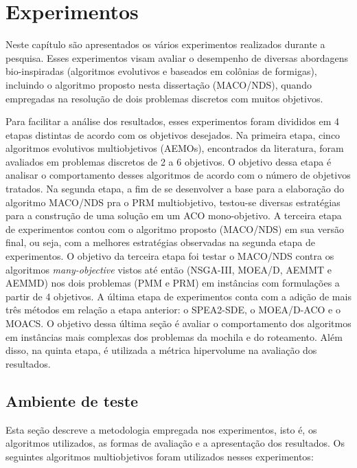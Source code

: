 \chapter[Experimentos]{Experimentos}
\label{chapter_experimentos}

Neste capítulo são apresentados os vários experimentos realizados durante a pesquisa. Esses experimentos visam avaliar o desempenho de diversas abordagens bio-inspiradas (algoritmos evolutivos e baseados em colônias de formigas), incluindo o algoritmo proposto nesta dissertação (MACO/NDS), quando empregadas na resolução de dois problemas discretos com muitos objetivos. 

Para facilitar a análise dos resultados, esses experimentos foram divididos em 4 etapas distintas de acordo com os objetivos desejados. Na primeira etapa, cinco algoritmos evolutivos multiobjetivos (AEMOs), encontrados da literatura, foram avaliados em problemas discretos de 2 a 6 objetivos. O objetivo dessa etapa é analisar o comportamento desses algoritmos de acordo com o número de objetivos tratados. Na segunda etapa, a fim de se desenvolver a base para a elaboração do algoritmo MACO/NDS pra o PRM multiobjetivo, testou-se diversas estratégias para a construção de uma solução em um ACO mono-objetivo. A terceira etapa de experimentos contou com o algoritmo proposto (MACO/NDS) em sua versão final, ou seja, com a melhores estratégias observadas na segunda etapa de experimentos. O objetivo da terceira etapa foi testar o MACO/NDS contra os algoritmos \textit{many-objective} vistos até então (NSGA-III, MOEA/D, AEMMT e AEMMD) nos dois problemas (PMM e PRM) em instâncias com formulações a partir de 4 objetivos. A última etapa de experimentos conta com a adição de mais três métodos em relação a etapa anterior: o SPEA2-SDE, o MOEA/D-ACO e o MOACS. O objetivo dessa última seção é avaliar o comportamento dos algoritmos em instâncias mais complexas dos problemas da mochila e do roteamento. Além disso, na quinta etapa, é utilizada a métrica hipervolume na avaliação dos resultados.

\section{Ambiente de teste}

Esta seção descreve a metodologia empregada nos experimentos, isto é, os algoritmos utilizados, as formas de avaliação e a apresentação dos resultados. Os seguintes algoritmos multiobjetivos foram utilizados nesses experimentos:

